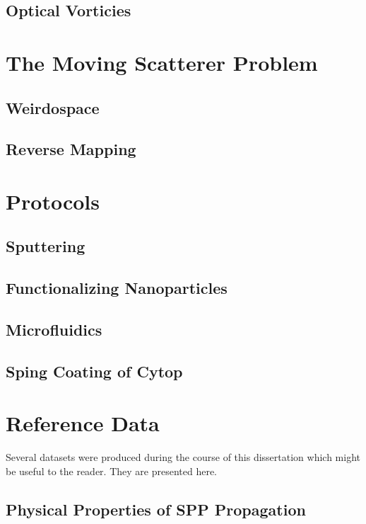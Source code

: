 \documentclass[a4paper,titlepage,onecolumn]{report}
\begin{document}
\section{Optical Vorticies}

\chapter{The Moving Scatterer Problem}
\section{Weirdospace}
\section{Reverse Mapping}






\appendix
\chapter{Protocols}
\section{Sputtering}
\section{Functionalizing Nanoparticles}
\section{Microfluidics}
\section{Sping Coating of Cytop}

\chapter{Reference Data}
Several datasets were produced during the course of this dissertation which
might be useful to the reader.  They are presented here.
\section{Physical Properties of SPP Propagation}
\end{document}
